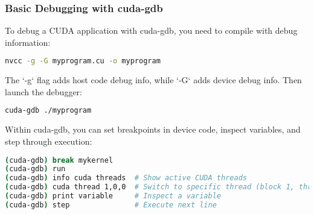 \subsubsection{Basic Debugging with cuda-gdb}

To debug a CUDA application with cuda-gdb, you need to compile with debug information:

\begin{lstlisting}[language=bash]
nvcc -g -G myprogram.cu -o myprogram
\end{lstlisting}

The `-g` flag adds host code debug info, while `-G` adds device debug info. Then launch the debugger:

\begin{lstlisting}[language=bash]
cuda-gdb ./myprogram
\end{lstlisting}

Within cuda-gdb, you can set breakpoints in device code, inspect variables, and step through execution:

\begin{lstlisting}[language=bash]
(cuda-gdb) break mykernel
(cuda-gdb) run
(cuda-gdb) info cuda threads  # Show active CUDA threads
(cuda-gdb) cuda thread 1,0,0  # Switch to specific thread (block 1, thread 0)
(cuda-gdb) print variable     # Inspect a variable
(cuda-gdb) step               # Execute next line
\end{lstlisting}


